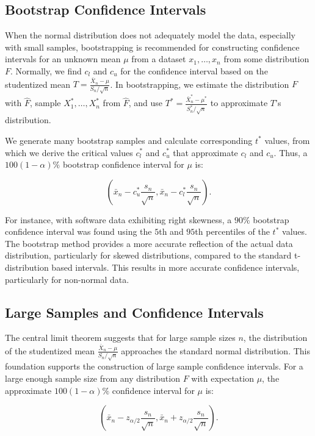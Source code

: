 \documentclass{article}
\begin{document}
\subsection{Bootstrap Confidence Intervals}

When the normal distribution does not adequately model the data, especially with small samples, bootstrapping is recommended for constructing confidence intervals for an unknown mean $\mu$ from a dataset $x_{1}, \ldots, x_{n}$ from some distribution $F$. Normally, we find $c_{l}$ and $c_{u}$ for the confidence interval based on the studentized mean $T=\frac{\bar{X}_{n}-\mu}{S_{n} / \sqrt{n}}$. In bootstrapping, we estimate the distribution $F$ with $\hat{F}$, sample $X_{1}^{*}, \ldots, X_{n}^{*}$ from $\hat{F}$, and use $T^{*}=\frac{\bar{X}_{n}^{*}-\mu^{*}}{S_{n}^{*} / \sqrt{n}}$ to approximate $T$'s distribution. 

We generate many bootstrap samples and calculate corresponding $t^{*}$ values, from which we derive the critical values $c_{l}^{*}$ and $c_{u}^{*}$ that approximate $c_{l}$ and $c_{u}$. Thus, a $100(1-\alpha)\%$ bootstrap confidence interval for $\mu$ is:

\[
\left(\bar{x}_{n}-c_{u}^{*} \frac{s_{n}}{\sqrt{n}}, \bar{x}_{n}-c_{l}^{*} \frac{s_{n}}{\sqrt{n}}\right).
\]

For instance, with software data exhibiting right skewness, a $90\%$ bootstrap confidence interval was found using the $5$th and $95$th percentiles of the $t^{*}$ values. The bootstrap method provides a more accurate reflection of the actual data distribution, particularly for skewed distributions, compared to the standard t-distribution based intervals. This results in more accurate confidence intervals, particularly for non-normal data.

\subsection*{Large Samples and Confidence Intervals}

The central limit theorem suggests that for large sample sizes $n$, the distribution of the studentized mean $\frac{\bar{X}_{n}-\mu}{S_{n} / \sqrt{n}}$ approaches the standard normal distribution. This foundation supports the construction of large sample confidence intervals. For a large enough sample size from any distribution $F$ with expectation $\mu$, the approximate $100(1-\alpha) \%$ confidence interval for $\mu$ is:

\[
\left(\bar{x}_{n}-z_{\alpha / 2} \frac{s_{n}}{\sqrt{n}}, \bar{x}_{n}+z_{\alpha / 2} \frac{s_{n}}{\sqrt{n}}\right).
\]
\end{document}
